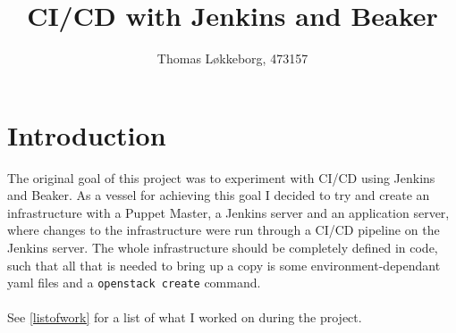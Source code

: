 

\title{CI/CD with Jenkins and Beaker}
\author{Thomas Løkkeborg, 473157} %



\maketitle


\thispagestyle{empty}

\clearpage
{}
\setcounter{page}{1}
\tableofcontents

\clearpage
{}

\section{Introduction}

The original goal of this project was to experiment with CI/CD using Jenkins and Beaker. As a vessel for achieving this goal I decided to try and create an infrastructure with a Puppet Master, a Jenkins server and an application server, where changes to the infrastructure were run through a CI/CD pipeline on the Jenkins server. The whole infrastructure should be completely defined in code, such that all that is needed to bring up a copy is some environment-dependant yaml files and a \texttt{openstack create} command.
\\
\\
See \ref{listofwork} for a list of what I worked on during the project.

